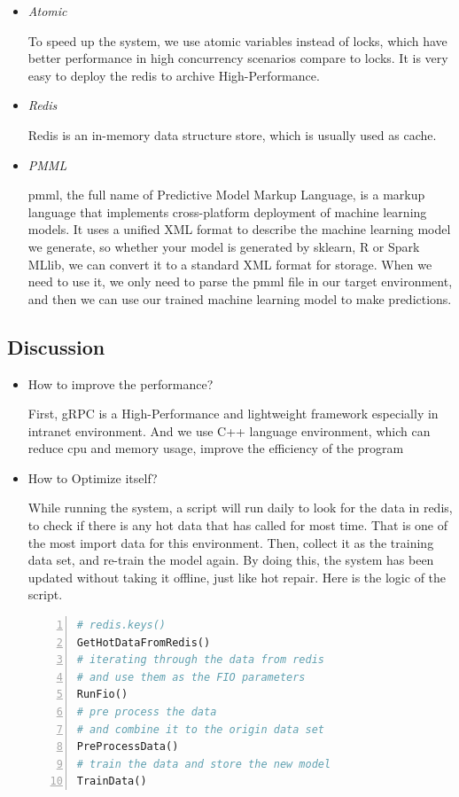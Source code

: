 \documentclass[conference]{IEEEtran}
\begin{document}
\begin{itemize}
	\item \emph{Atomic}

	      To speed up the system, we use atomic variables instead of locks, which have better performance in high concurrency scenarios compare to locks.
	      It is very easy to deploy the redis to archive High-Performance.

	\item \emph{Redis}

	      Redis is an in-memory data structure store, which is usually used as cache.

	\item \emph{PMML}

	pmml, the full name of Predictive Model Markup Language, is a markup language that implements cross-platform deployment of machine learning models. It uses a unified XML format to describe the machine learning model we generate, so whether your model is generated by sklearn, R or Spark MLlib, we can convert it to a standard XML format for storage. When we need to use it, we only need to parse the pmml file in our target environment, and then we can use our trained machine learning model to make predictions.



\end{itemize}

\subsection{Discussion}
\begin{itemize}
	\item How to improve the performance?

	      First, gRPC is a High-Performance and lightweight framework especially in intranet environment.
		  And we use C++ language environment, which can reduce cpu and memory usage, improve the efficiency of the program

	\item How to Optimize itself?

	      While running the system, a script will run daily to look for the data in redis, to check if there is any hot data that has called for most time.
	      That is one of the most import data for this environment. Then, collect it as the training data set, and re-train the model again.
	      By doing this, the system has been updated without taking it offline, just like hot repair.
		  Here is the logic of the script.

	      \begin{lstlisting}[language={python},
		basicstyle=\normalsize\menlo,
        numbers=left]
# redis.keys()
GetHotDataFromRedis()
# iterating through the data from redis
# and use them as the FIO parameters
RunFio()
# pre process the data
# and combine it to the origin data set
PreProcessData()
# train the data and store the new model
TrainData()
\end{lstlisting}


\end{itemize}
\end{document}
